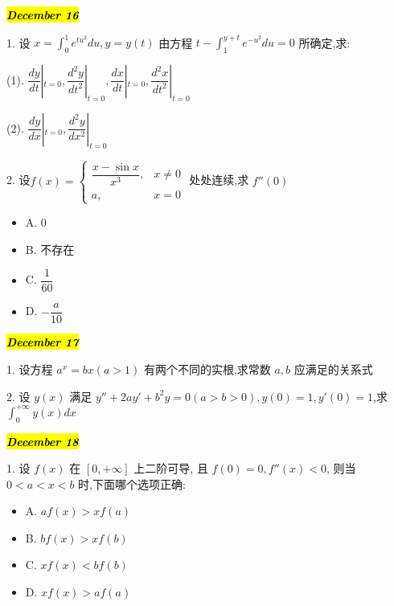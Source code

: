 \hl{\textbf{\textit{December 16}}}

1. 设 $x=\int_{0}^{1}e^{tu^{2}}du,y=y(t)$ 由方程 $\displaystyle{t-\int_{1}^{y+t}e^{-u^{2}}du=0}$ 所确定,求:

(1). $\dfrac{dy}{dt}|_{t=0},\dfrac{d^{2}y}{dt^{2}}|_{t=0},\dfrac{dx}{dt}|_{t=0},\dfrac{d^{2}x}{dt^{2}}|_{t=0}$

(2). $\dfrac{dy}{dx}|_{t=0},\dfrac{d^{2}y}{dx^{2}}|_{t=0}$
\begin{solution}
	
\end{solution}

2. 设$f(x)=
\begin{cases}
	\dfrac{x-\sin x}{x^{3}}, &x\neq 0\\
	a, &x=0
\end{cases}$ 处处连续,求 $f''(0)$
\begin{itemize}
	\item A. $0$
	\item B. 不存在
	\item C. $\dfrac{1}{60}$
	\item D. $-\dfrac{a}{10}$
\end{itemize}
\begin{solution}
	
\end{solution}

\hl{\textbf{\textit{December 17}}}

1. 设方程 $a^{x}=bx(a>1)$ 有两个不同的实根,求常数 $a,b$ 应满足的关系式
\begin{solution}
	
\end{solution}

2. 设 $y(x)$ 满足 $y''+2ay'+b^{2}y=0(a>b>0),y(0)=1,y'(0)=1$,求 $\displaystyle{\int_{0}^{+\infty}y(x)dx}$
\begin{solution}
	
\end{solution}

\hl{\textbf{\textit{December 18}}}

1. 设 $f(x)$ 在 $[0,+\infty]$ 上二阶可导, 且 $f(0)=0,f''(x)<0$, 则当 $0<a<x<b$ 时,下面哪个选项正确:
\begin{itemize}
	\item A. $af(x)>xf(a)$
	\item B. $bf(x)>xf(b)$
	\item C. $xf(x)<bf(b)$
	\item D. $xf(x)>af(a)$
\end{itemize}
\begin{solution}
	
\end{solution}


